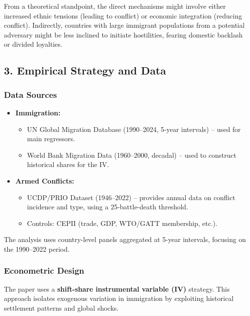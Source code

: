 \documentclass[
  letterpaper,
  DIV=11,
  numbers=noendperiod]{scrartcl}
\begin{document}
From a theoretical standpoint, the direct mechanisms might involve
either increased ethnic tensions (leading to conflict) or economic
integration (reducing conflict). Indirectly, countries with large
immigrant populations from a potential adversary might be less inclined
to initiate hostilities, fearing domestic backlash or divided loyalties.

\subsection{3. Empirical Strategy and
Data}\label{empirical-strategy-and-data}

\subsubsection{Data Sources}\label{data-sources}

\begin{itemize}
\item
  \textbf{Immigration:}

  \begin{itemize}
  \item
    UN Global Migration Database (1990--2024, 5-year intervals) -- used
    for main regressors.
  \item
    World Bank Migration Data (1960--2000, decadal) -- used to construct
    historical shares for the IV.
  \end{itemize}
\item
  \textbf{Armed Conflicts:}

  \begin{itemize}
  \item
    UCDP/PRIO Dataset (1946--2022) -- provides annual data on conflict
    incidence and type, using a 25-battle-death threshold.
  \item
    Controls: CEPII (trade, GDP, WTO/GATT membership, etc.).
  \end{itemize}
\end{itemize}

The analysis uses country-level panels aggregated at 5-year intervals,
focusing on the 1990--2022 period.

\subsubsection{Econometric Design}\label{econometric-design}

The paper uses a \textbf{shift-share instrumental variable (IV)}
strategy. This approach isolates exogenous variation in immigration by
exploiting historical settlement patterns and global shocks.
\end{document}
